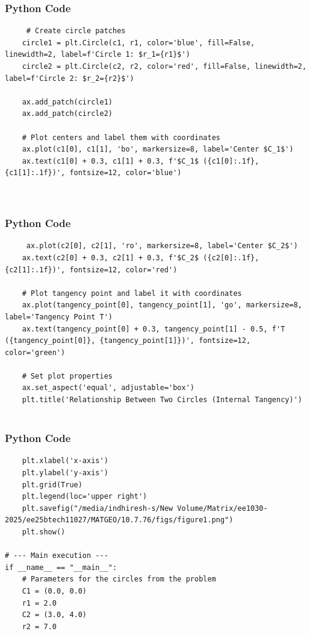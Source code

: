 \documentclass{beamer}
\begin{document}
    \begin{frame}[fragile]
        \frametitle{Python Code}
        \begin{lstlisting}
     # Create circle patches
    circle1 = plt.Circle(c1, r1, color='blue', fill=False, linewidth=2, label=f'Circle 1: $r_1={r1}$')
    circle2 = plt.Circle(c2, r2, color='red', fill=False, linewidth=2, label=f'Circle 2: $r_2={r2}$')

    ax.add_patch(circle1)
    ax.add_patch(circle2)

    # Plot centers and label them with coordinates
    ax.plot(c1[0], c1[1], 'bo', markersize=8, label='Center $C_1$')
    ax.text(c1[0] + 0.3, c1[1] + 0.3, f'$C_1$ ({c1[0]:.1f}, {c1[1]:.1f})', fontsize=12, color='blue')
    
   
        \end{lstlisting}
    \end{frame}
    
    \begin{frame}[fragile]
        \frametitle{Python Code}
        \begin{lstlisting}
     ax.plot(c2[0], c2[1], 'ro', markersize=8, label='Center $C_2$')
    ax.text(c2[0] + 0.3, c2[1] + 0.3, f'$C_2$ ({c2[0]:.1f}, {c2[1]:.1f})', fontsize=12, color='red')

    # Plot tangency point and label it with coordinates
    ax.plot(tangency_point[0], tangency_point[1], 'go', markersize=8, label='Tangency Point T')
    ax.text(tangency_point[0] + 0.3, tangency_point[1] - 0.5, f'T ({tangency_point[0]}, {tangency_point[1]})', fontsize=12, color='green')

    # Set plot properties
    ax.set_aspect('equal', adjustable='box')
    plt.title('Relationship Between Two Circles (Internal Tangency)')
    

        \end{lstlisting}
    \end{frame}

    \begin{frame}[fragile]
        \frametitle{Python Code}
        \begin{lstlisting}
    plt.xlabel('x-axis')
    plt.ylabel('y-axis')
    plt.grid(True)
    plt.legend(loc='upper right')
    plt.savefig("/media/indhiresh-s/New Volume/Matrix/ee1030-2025/ee25btech11027/MATGEO/10.7.76/figs/figure1.png")
    plt.show()

# --- Main execution ---
if __name__ == "__main__":
    # Parameters for the circles from the problem
    C1 = (0.0, 0.0)
    r1 = 2.0
    C2 = (3.0, 4.0)
    r2 = 7.0

   
        \end{lstlisting}
    \end{frame}
\end{document}
